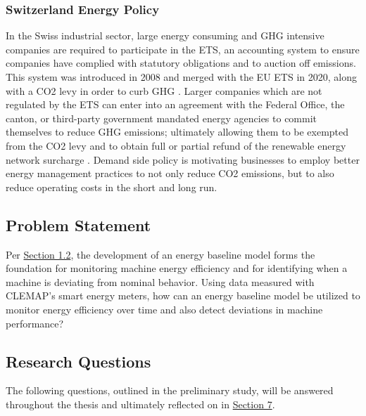 \subsubsection{Switzerland Energy Policy}
In the Swiss industrial sector, large energy consuming and \ac{GHG} intensive companies are required to participate in the \ac{ETS}, an accounting system to ensure companies have complied with statutory obligations and to auction off emissions. This system was introduced in 2008 and merged with the \ac{EU} ETS in 2020, along with a \ac{CO2} levy in order to curb GHG \cite{carbon_trading}. Larger companies which are not regulated by the ETS can enter into an agreement with the Federal Office, the canton, or third-party government mandated energy agencies to commit themselves to reduce GHG emissions; ultimately allowing them to be exempted from the CO2 levy and to obtain full or partial refund of the renewable energy network surcharge \cite{optional}. Demand side policy is motivating businesses to employ better energy management practices to not only reduce CO2 emissions, but to also reduce operating costs in the short and long run. 

\subsection{Problem Statement}

Per \hyperlink{subsection.1.2}{Section 1.2}, the development of an energy baseline model forms the foundation for monitoring machine energy efficiency and for identifying when a machine is deviating from nominal behavior. Using data measured with CLEMAP's smart energy meters, how can an energy baseline model be utilized to monitor energy efficiency over time and also detect deviations in machine performance?

\subsection{Research Questions}

The following questions, outlined in the preliminary study, will be answered throughout the thesis and ultimately reflected on in \hyperlink{section.7}{Section 7}. 


